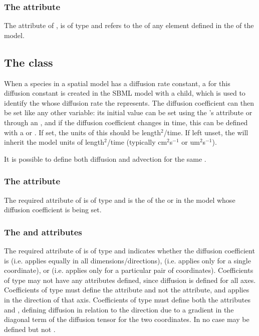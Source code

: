 \subsubsection{The \fixttspace{} attribute}
The  attribute of \SpatialSymbolReference, is of type  and refers to the  of any element defined in the \Geometry of the model.

\subsection{The  class}
\label{diffusioncoefficient-class}
When a species in a spatial model has a diffusion rate constant, a \Parameter for this diffusion constant is created in the SBML model with a \DiffusionCoefficient child, which is used to identify the \Species whose diffusion rate the \Parameter represents. The diffusion coefficient can then be set like any other variable:  its initial value can be set using the \Parameter's  attribute or through an \InitialAssignment, and if the diffusion coefficient changes in time, this can be defined with a \Rule or \Event. If set, the units of this \Parameter should be length$^2$/time.  If left unset, the \DiffusionCoefficient will inherit the model units of length$^2$/time (typically cm$^2$s$^{-1}$ or um$^2$s$^{-1}$).


It is possible to define both diffusion and advection for the same \Species.

\subsubsection{The \fixttspace{} attribute}
The required  attribute of \DiffusionCoefficient is of type  and is the  of the \Species or \Parameter in the model whose diffusion coefficient is being set.

\subsubsection{The \fixttspace{} and  attributes}
The required  attribute of \DiffusionCoefficient is of type  and indicates whether the diffusion coefficient is  (i.e. applies equally in all dimensions/directions),  (i.e. applies only for a single coordinate), or  (i.e. applies only for a particular pair of coordinates). Coefficients of type  may not have any  attributes defined, since diffusion is defined for all axes.  Coefficients of type  must define the  attribute and not the  attribute, and applies in the direction of that axis.  Coefficients of type  must define both the attributes  and , defining diffusion in relation to the direction due to a gradient in the diagonal term of the diffusion tensor for the two coordinates.  In no case may  be defined but not .

